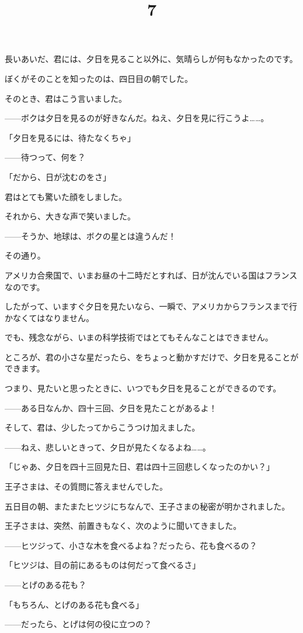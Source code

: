 長いあいだ、君には、夕日を見ること以外に、気晴らしが何もなかったのです。

ぼくがそのことを知ったのは、四日目の朝でした。

そのとき、君はこう言いました。

——ボクは夕日を見るのが好きなんだ。ねえ、夕日を見に行こうよ……。

「夕日を見るには、待たなくちゃ」

——待つって、何を？

「だから、日が沈むのをさ」

君はとても驚いた顔をしました。

それから、大きな声で笑いました。

——そうか、地球は、ボクの星とは違うんだ！

その通り。

アメリカ合衆国で、いまお昼の十二時だとすれば、日が沈んでいる国はフランスなのです。

したがって、いますぐ夕日を見たいなら、一瞬で、アメリカからフランスまで行かなくてはなりません。

でも、残念ながら、いまの科学技術ではとてもそんなことはできません。

ところが、君の小さな星だったら、をちょっと動かすだけで、夕日を見ることができます。

つまり、見たいと思ったときに、いつでも夕日を見ることができるのです。

——ある日なんか、四十三回、夕日を見たことがあるよ！

そして、君は、少したってからこうつけ加えました。

——ねえ、悲しいときって、夕日が見たくなるよね……。

「じゃあ、夕日を四十三回見た日、君は四十三回悲しくなったのかい？」

王子さまは、その質問に答えませんでした。

\title{7}

五日目の朝、またまたヒツジにちなんで、王子さまの秘密が明かされました。

王子さまは、突然、前置きもなく、次のように聞いてきました。

——ヒツジって、小さな木を食べるよね？だったら、花も食べるの？

「ヒツジは、目の前にあるものは何だって食べるさ」

——とげのある花も？

「もちろん、とげのある花も食べる」

——だったら、とげは何の役に立つの？

